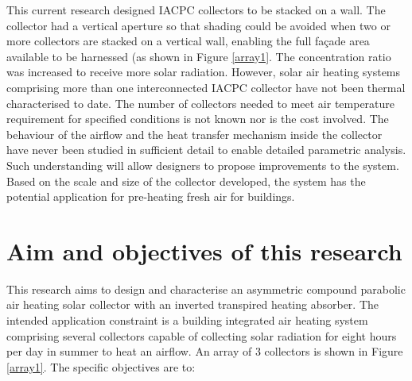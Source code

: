 This current research designed IACPC collectors to be stacked on a wall. The collector had a vertical aperture so that shading could be avoided when two or more collectors are stacked on a vertical wall, enabling the full façade area available to be harnessed (as shown in Figure \ref{array1}. The concentration ratio was increased to receive more solar radiation. However, solar air heating systems comprising more than one interconnected IACPC collector have not been thermal characterised to date. The number of collectors needed to meet air temperature requirement for specified conditions is not known nor is the cost involved. The behaviour of the airflow and the heat transfer mechanism inside the collector have never been studied in sufficient detail to enable detailed parametric analysis. Such understanding will allow designers to propose improvements to the system. Based on the scale and size of the collector developed, the system has the potential application for pre-heating fresh air for buildings.



\section{Aim and objectives of this research}
This research aims to design and characterise an asymmetric compound parabolic air heating solar collector with an inverted transpired heating absorber. The intended application constraint is a building integrated air heating system comprising several collectors capable of collecting solar radiation for eight hours per day in summer to heat an airflow. An array of 3 collectors is shown in Figure \ref{array1}. The specific objectives are to:

